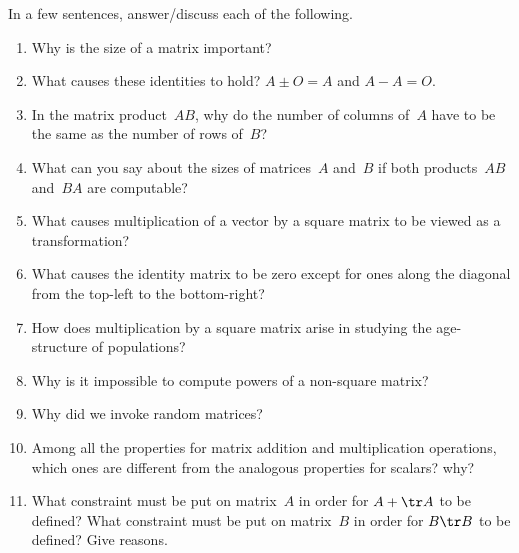 \begin{exercise}  
In a few sentences, answer\slash discuss each of the following.
\begin{enumerate}
\item Why is the size of a matrix important?

\item What causes these identities to hold? \(A\pm O=A\) and \(A-A=O\).

\item In the matrix product~\(AB\), why do the number of columns of~\(A\) have to be the same as the number of rows of~\(B\)?

\item What can you say about the sizes of matrices~\(A\) and~\(B\) if both products~\(AB\) and~\(BA\) are computable?

\item What causes multiplication of a vector by a square matrix to be viewed as a transformation?

\item What causes the identity matrix to be zero except for ones along the diagonal from the top-left to the bottom-right?

\item How does multiplication by a square matrix arise in studying the age-structure of populations?

\item Why is it impossible to compute powers of a non-square matrix?

\item Why did we invoke random matrices?

\item Among all the properties for matrix addition and multiplication operations, which ones are different from the analogous properties for scalars?  why?

\item What constraint must be put on matrix~\(A\) in order for \(A+\tr A\) to be defined?  
What constraint must be put on matrix~\(B\) in order for \(B\tr B\) to be defined?  
Give reasons.

\end{enumerate}
\end{exercise}

